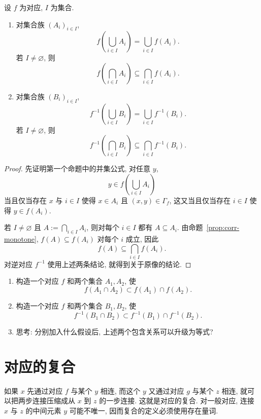 \documentclass[usesamecnt, thmcnt=section, lang=cn, newtx, 10pt, scheme=chinese]{elegantbook}
\begin{document}
\begin{proposition}\label{prop:corr-union-intersection}
设 $f$ 为对应, $I$ 为集合.
\begin{enumerate}[label=\rm(\arabic*)]
  \item 对集合族 $(A_i)_{i\in I}$,
  \[
   f\left(\bigcup_{i\in I}A_i\right)
   =\bigcup_{i\in I}f(A_i).
  \]
  若 $I\neq\varnothing$, 则
  \[
   f\left(\bigcap_{i\in I}A_i\right)
   \subseteq\bigcap_{i\in I}f(A_i).
  \]
  \item 对集合族 $(B_i)_{i\in I}$,
  \[
   f^{-1}\left(\bigcup_{i\in I}B_i\right)
   =\bigcup_{i\in I}f^{-1}(B_i).
  \]
  若 $I\neq\varnothing$, 则
  \[
   f^{-1}\left(\bigcap_{i\in I}B_i\right)
   \subseteq\bigcap_{i\in I}f^{-1}(B_i).
  \]
\end{enumerate}
\end{proposition}

\begin{proof}
先证明第一个命题中的并集公式, 对任意 $y$,
\[
 y\in f\left(\bigcup_{i\in I}A_i\right)
\]
当且仅当存在 $x$ 与 $i\in I$ 使得 $x\in A_i$ 且 $(x,y)\in\Gamma_f$, 这又当且仅当存在 $i\in I$ 使得 $y\in f(A_i)$.

若 $I\neq\varnothing$ 且 $A:=\bigcap_{i\in I}A_i$, 则对每个 $i\in I$ 都有 $A\subseteq A_i$. 由命题~\ref{prop:corr-monotone}, $f(A)\subseteq f(A_i)$ 对每个 $i$ 成立, 因此
\[
 f(A)\subseteq\bigcap_{i\in I}f(A_i).
\]
对逆对应 $f^{-1}$ 使用上述两条结论, 就得到关于原像的结论.
\end{proof}

\begin{exercise}\label{ex:corr-union-intersection}
\begin{enumerate}[label=\rm(\arabic*)]
  \item 构造一个对应 $f$ 和两个集合 $A_1,A_2$, 使
  \[
   f(A_1\cap A_2)\subset f(A_1)\cap f(A_2).
  \]
  \item 构造一个对应 $f$ 和两个集合 $B_1,B_2$, 使
  \[
   f^{-1}(B_1\cap B_2)\subset f^{-1}(B_1)\cap f^{-1}(B_2).
  \]
  \item 思考: 分别加入什么假设后, 上述两个包含关系可以升级为等式?
\end{enumerate}
\end{exercise}

\section{对应的复合}

如果 $x$ 先通过对应 $f$ 与某个 $y$ 相连, 而这个 $y$ 又通过对应 $g$ 与某个 $z$ 相连, 就可以把两步连接压缩成从 $x$ 到 $z$ 的一步连接. 这就是对应的复合. 对一般对应, 连接 $x$ 与 $z$ 的中间元素 $y$ 可能不唯一, 因而复合的定义必须使用存在量词.
\end{document}
